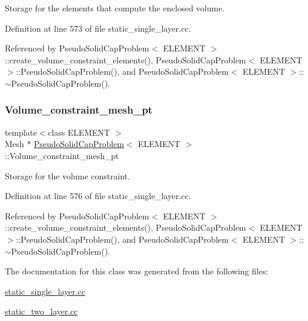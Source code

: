 Storage for the elements that compute the enclosed volume. 



Definition at line 573 of file static\+\_\+single\+\_\+layer.\+cc.



Referenced by Pseudo\+Solid\+Cap\+Problem$<$ E\+L\+E\+M\+E\+N\+T $>$\+::create\+\_\+volume\+\_\+constraint\+\_\+elements(), Pseudo\+Solid\+Cap\+Problem$<$ E\+L\+E\+M\+E\+N\+T $>$\+::\+Pseudo\+Solid\+Cap\+Problem(), and Pseudo\+Solid\+Cap\+Problem$<$ E\+L\+E\+M\+E\+N\+T $>$\+::$\sim$\+Pseudo\+Solid\+Cap\+Problem().

\mbox{\label{classPseudoSolidCapProblem_a65b3318c82437c510f23ee0ae898ff6c}} 
\subsubsection{\texorpdfstring{Volume\+\_\+constraint\+\_\+mesh\+\_\+pt}{Volume\_constraint\_mesh\_pt}}
{\footnotesize\ttfamily template$<$class E\+L\+E\+M\+E\+NT $>$ \\
Mesh $\ast$ \hyperlink{classPseudoSolidCapProblem}{Pseudo\+Solid\+Cap\+Problem}$<$ E\+L\+E\+M\+E\+NT $>$\+::Volume\+\_\+constraint\+\_\+mesh\+\_\+pt\hspace{0.3cm}{\ttfamily [private]}}



Storage for the volume constraint. 



Definition at line 576 of file static\+\_\+single\+\_\+layer.\+cc.



Referenced by Pseudo\+Solid\+Cap\+Problem$<$ E\+L\+E\+M\+E\+N\+T $>$\+::create\+\_\+volume\+\_\+constraint\+\_\+elements(), Pseudo\+Solid\+Cap\+Problem$<$ E\+L\+E\+M\+E\+N\+T $>$\+::\+Pseudo\+Solid\+Cap\+Problem(), and Pseudo\+Solid\+Cap\+Problem$<$ E\+L\+E\+M\+E\+N\+T $>$\+::$\sim$\+Pseudo\+Solid\+Cap\+Problem().



The documentation for this class was generated from the following files\+:\begin{DoxyCompactItemize}
\item 
\hyperlink{static__single__layer_8cc}{static\+\_\+single\+\_\+layer.\+cc}\item 
\hyperlink{static__two__layer_8cc}{static\+\_\+two\+\_\+layer.\+cc}\end{DoxyCompactItemize}
